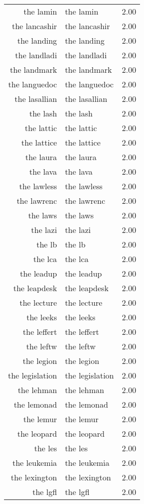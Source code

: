 \begin{table}[ht]
\begin{tabular}{rlr}
  the lamin & the lamin & 2.00 \\ 
  the lancashir & the lancashir & 2.00 \\ 
  the landing & the landing & 2.00 \\ 
  the landladi & the landladi & 2.00 \\ 
  the landmark & the landmark & 2.00 \\ 
  the languedoc & the languedoc & 2.00 \\ 
  the lasallian & the lasallian & 2.00 \\ 
  the lash & the lash & 2.00 \\ 
  the lattic & the lattic & 2.00 \\ 
  the lattice & the lattice & 2.00 \\ 
  the laura & the laura & 2.00 \\ 
  the lava & the lava & 2.00 \\ 
  the lawless & the lawless & 2.00 \\ 
  the lawrenc & the lawrenc & 2.00 \\ 
  the laws & the laws & 2.00 \\ 
  the lazi & the lazi & 2.00 \\ 
  the lb & the lb & 2.00 \\ 
  the lca & the lca & 2.00 \\ 
  the leadup & the leadup & 2.00 \\ 
  the leapdesk & the leapdesk & 2.00 \\ 
  the lecture & the lecture & 2.00 \\ 
  the leeks & the leeks & 2.00 \\ 
  the leffert & the leffert & 2.00 \\ 
  the leftw & the leftw & 2.00 \\ 
  the legion & the legion & 2.00 \\ 
  the legislation & the legislation & 2.00 \\ 
  the lehman & the lehman & 2.00 \\ 
  the lemonad & the lemonad & 2.00 \\ 
  the lemur & the lemur & 2.00 \\ 
  the leopard & the leopard & 2.00 \\ 
  the les & the les & 2.00 \\ 
  the leukemia & the leukemia & 2.00 \\ 
  the lexington & the lexington & 2.00 \\ 
  the lgfl & the lgfl & 2.00 \\ 

\end{tabular}
\end{table}
